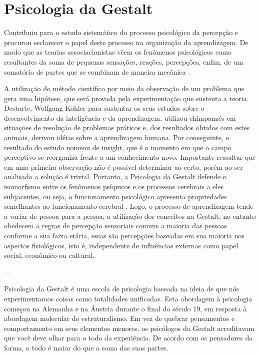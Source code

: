 \section{Psicologia da Gestalt}\label{gestalt}


Contribuiu para o estudo sistemático do processo psicológico da percepção e procurou esclarecer o papel deste processo na organização da aprendizagem.
De modo que as teorias associacionistas vêem os fenômenos psicológicos como resultantes da soma de pequenas sensações, reações, percepções, enfim, de um somatório de partes que se combinam de maneira mecânica \cite{silva2007psicologia_educacao}.

A utilização do método científico por meio da observação de um problema que gera uma hipótese, que será provada pela experimentação que sustenta a teoria. 
Destarte, Wolfgang Kohler para sustentar os seus estudos sobre o desenvolvimento da inteligência e da
aprendizagem, utilizou chimpanzés em situações de resolução de problemas práticos e, dos resultados obtidos com estes animais, derivou idéias sobre a aprendizagem humana. 
Por conseguinte, o resultado do estudo nomeou de insight, que é o momento em que o campo perceptivo se reorganiza frente a um conhecimento novo. 
Importante ressaltar que em uma primeira observação não é possível determinar ao certo, porém ao ser analisado a solução é trivial.
Portanto, a Psicologia da Gestalt defende o isomorfismo entre os fenômenos psíquicos e os
processos cerebrais a eles subjacentes, ou seja, o funcionamento psicológico apresenta propriedades semelhantes ao funcionamento cerebral \cite{silva2007psicologia_educacao}. 
Logo, o processo de aprendizagem tende a variar de pessoa para a pessoa, a utilização dos
conceitos na Gestalt, no entanto obedecem a regras de percepção sensoriais comuns a maioria das pessoas conforme a sua faixa etária, essas são percepções baseadas em sua maioria nos aspectos fisiológicos, isto é, independente de influências externas como papel social, econômico ou cultural.


---

Psicologia da Gestalt é uma escola de psicologia baseada na ideia de que nós experimentamos coisas como totalidades unificadas. 
Esta abordagem à psicologia começou na Alemanha e na Áustria durante o final do século 19, em resposta à abordagem molecular do estruturalismo. 
Em vez de quebrar pensamentos e comportamento em seus elementos menores, os psicólogos da Gestalt acreditavam que você deve olhar para o todo da experiência. 
De acordo com os pensadores da forma, o todo é maior do que a soma das suas partes.

